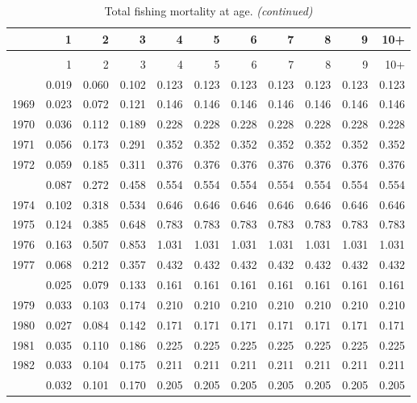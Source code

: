 \documentclass[
]{article}
\begin{document}
\begin{longtable}[t]{lrrrrrrrrrr}
\caption{\label{tab:FAA-tot-table}Total fishing mortality at age.}\\
\toprule
  & 1 & 2 & 3 & 4 & 5 & 6 & 7 & 8 & 9 & 10+\\
\midrule
\endfirsthead
\caption[]{Total fishing mortality at age. \textit{(continued)}}\\
\toprule
  & 1 & 2 & 3 & 4 & 5 & 6 & 7 & 8 & 9 & 10+\\
\midrule
\endhead

\endfoot
\bottomrule
\endlastfoot
1968 & 0.019 & 0.060 & 0.102 & 0.123 & 0.123 & 0.123 & 0.123 & 0.123 & 0.123 & 0.123\\
1969 & 0.023 & 0.072 & 0.121 & 0.146 & 0.146 & 0.146 & 0.146 & 0.146 & 0.146 & 0.146\\
1970 & 0.036 & 0.112 & 0.189 & 0.228 & 0.228 & 0.228 & 0.228 & 0.228 & 0.228 & 0.228\\
1971 & 0.056 & 0.173 & 0.291 & 0.352 & 0.352 & 0.352 & 0.352 & 0.352 & 0.352 & 0.352\\
1972 & 0.059 & 0.185 & 0.311 & 0.376 & 0.376 & 0.376 & 0.376 & 0.376 & 0.376 & 0.376\\
\addlinespace
1973 & 0.087 & 0.272 & 0.458 & 0.554 & 0.554 & 0.554 & 0.554 & 0.554 & 0.554 & 0.554\\
1974 & 0.102 & 0.318 & 0.534 & 0.646 & 0.646 & 0.646 & 0.646 & 0.646 & 0.646 & 0.646\\
1975 & 0.124 & 0.385 & 0.648 & 0.783 & 0.783 & 0.783 & 0.783 & 0.783 & 0.783 & 0.783\\
1976 & 0.163 & 0.507 & 0.853 & 1.031 & 1.031 & 1.031 & 1.031 & 1.031 & 1.031 & 1.031\\
1977 & 0.068 & 0.212 & 0.357 & 0.432 & 0.432 & 0.432 & 0.432 & 0.432 & 0.432 & 0.432\\
\addlinespace
1978 & 0.025 & 0.079 & 0.133 & 0.161 & 0.161 & 0.161 & 0.161 & 0.161 & 0.161 & 0.161\\
1979 & 0.033 & 0.103 & 0.174 & 0.210 & 0.210 & 0.210 & 0.210 & 0.210 & 0.210 & 0.210\\
1980 & 0.027 & 0.084 & 0.142 & 0.171 & 0.171 & 0.171 & 0.171 & 0.171 & 0.171 & 0.171\\
1981 & 0.035 & 0.110 & 0.186 & 0.225 & 0.225 & 0.225 & 0.225 & 0.225 & 0.225 & 0.225\\
1982 & 0.033 & 0.104 & 0.175 & 0.211 & 0.211 & 0.211 & 0.211 & 0.211 & 0.211 & 0.211\\
\addlinespace
1983 & 0.032 & 0.101 & 0.170 & 0.205 & 0.205 & 0.205 & 0.205 & 0.205 & 0.205 & 0.205\\

\end{longtable}
\end{document}
